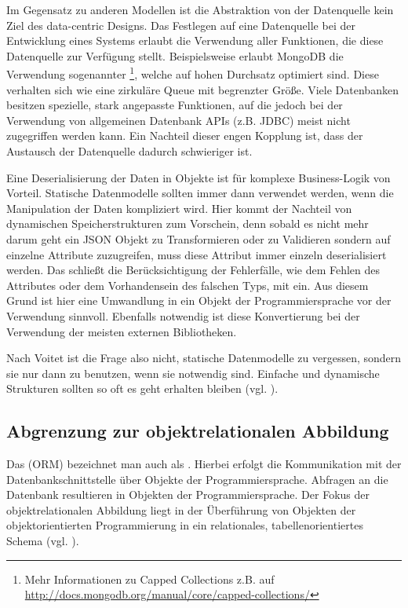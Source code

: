 Im Gegensatz zu anderen Modellen ist die Abstraktion von der Datenquelle kein Ziel des data-centric Designs. Das Festlegen auf eine Datenquelle bei der Entwicklung eines Systems erlaubt die Verwendung aller Funktionen, die diese Datenquelle zur Verfügung stellt. Beispielsweise erlaubt MongoDB die Verwendung sogenannter \footnote{Mehr Informationen zu Capped Collections z.B. auf \url{http://docs.mongodb.org/manual/core/capped-collections/}}, welche auf hohen Durchsatz optimiert sind. Diese verhalten sich wie eine zirkuläre Queue mit begrenzter Größe. Viele Datenbanken besitzen spezielle, stark angepasste Funktionen, auf die jedoch bei der Verwendung von allgemeinen Datenbank APIs (z.B. JDBC) meist nicht zugegriffen werden kann. Ein Nachteil dieser engen Kopplung ist, dass der Austausch der Datenquelle dadurch schwieriger ist. 

Eine Deserialisierung der Daten in Objekte ist für komplexe Business-Logik von Vorteil. Statische Datenmodelle sollten immer dann verwendet werden, wenn die Manipulation der Daten kompliziert wird. Hier kommt der Nachteil von dynamischen Speicherstrukturen zum Vorschein, denn sobald es nicht mehr darum geht ein JSON Objekt zu Transformieren oder zu Validieren sondern auf einzelne Attribute zuzugreifen, muss diese Attribut immer einzeln deserialisiert werden. Das schließt die Berücksichtigung der Fehlerfälle, wie dem Fehlen des Attributes oder dem Vorhandensein des falschen Typs, mit ein. Aus diesem Grund ist hier eine Umwandlung in ein Objekt der Programmiersprache vor der Verwendung sinnvoll. Ebenfalls notwendig ist diese Konvertierung bei der Verwendung der meisten externen Bibliotheken.

Nach Voitet ist die Frage also nicht, statische Datenmodelle zu vergessen, sondern sie nur dann zu benutzen, wenn sie notwendig sind. Einfache und dynamische Strukturen sollten so oft es geht erhalten bleiben (vgl. \cite{jctc}).

\subsection{Abgrenzung zur objektrelationalen Abbildung}
Das  (ORM) bezeichnet man auch als . Hierbei erfolgt die Kommunikation mit der Datenbankschnittstelle über Objekte der Programmiersprache. Abfragen an die Datenbank resultieren in Objekten der Programmiersprache. Der Fokus der objektrelationalen Abbildung liegt in der Überführung von Objekten der objektorientierten Programmierung in ein relationales, tabellenorientiertes Schema (vgl. \cite{wambler}). 

